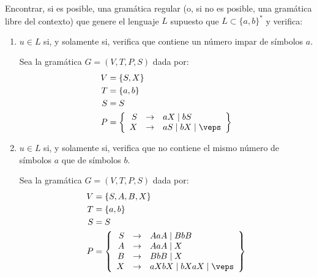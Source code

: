\begin{ejercicio}
    Encontrar, si es posible, una gramática regular (o, si no es posible, una gramática libre del contexto) que genere el lenguaje $L$ supuesto que $L \subset \{a, b\}^\ast$ y verifica:
    \begin{enumerate}
        \item $u \in L$ si, y solamente si, verifica que contiene un número impar de símbolos $a$.
        
        Sea la gramática $G=\left(V,T,P,S\right)$ dada por:
        \begin{align*}
            V &= \{S, X\} \\
            T &= \{a,b\} \\
            S &= S \\
            P &= \left\{
                \begin{array}{rcl}
                    S &\rightarrow & aX \mid bS\\
                    X &\rightarrow & aS \mid bX \mid \veps
                \end{array}
            \right\}
        \end{align*}
        \item $u \in L$ si, y solamente si, verifica que no contiene el mismo número de símbolos $a$ que de símbolos $b$.
        
        Sea la gramática $G=\left(V,T,P,S\right)$ dada por:
        \begin{align*}
            V &= \{S, A, B, X\} \\
            T &= \{a,b\} \\
            S &= S \\
            P &= \left\{
                \begin{array}{rcl}
                    S &\rightarrow & AaA \mid BbB \\
                    A &\rightarrow & AaA\mid X \\
                    B &\rightarrow & BbB \mid X \\
                    X &\rightarrow & aXbX \mid bXaX \mid \veps
                \end{array}
            \right\}
        \end{align*}
    \end{enumerate}
\end{ejercicio}



